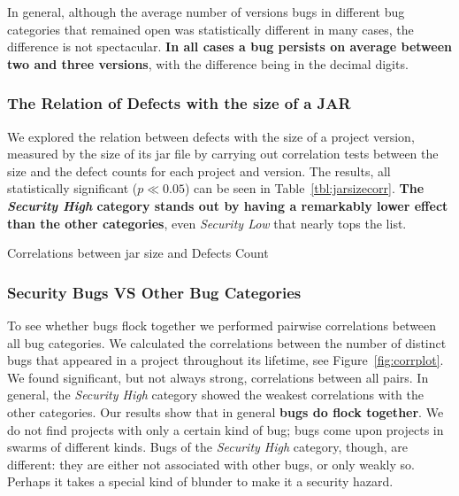 \documentclass{sig-alternate}
\begin{document}
In general, although the average number of versions bugs in different
bug categories that remained open was statistically different in many
cases, the difference is not spectacular. \textbf{In all cases a bug persists
on average between two and three versions}, with the difference being
in the decimal digits.

\subsubsection{The Relation of Defects with the size of a JAR}

We explored the relation between defects with the size of a project
version, measured by the size of its {\sc jar} file by carrying out
correlation tests between the size and the defect counts for each
project and version. The results, all statistically significant ($p
\ll 0.05$) can be seen in Table~\ref{tbl:jarsizecorr}.  \textbf{The {\it
  Security High} category stands out by having a remarkably lower
effect than the other categories}, even {\it Security Low} that nearly
tops the list.

\begin{table}[hbt]
    \centering
    \caption{Correlations between {\sc jar} size and Defects Count}
    \label{tbl:jarsizecorr}
    
\end{table}

\subsubsection{Security Bugs VS Other Bug Categories}

To see whether bugs flock together we performed pairwise correlations
between all bug categories. We calculated the correlations between the
number of distinct bugs that appeared in a project throughout its
lifetime, see Figure~\ref{fig:corrplot}. We found significant, but not always
strong, correlations between all pairs. In general, the {\it Security
  High} category showed the weakest correlations with the other
categories. Our results show that in general \textbf{bugs do flock together}.
We do not find projects with only a certain kind of bug; bugs come
upon projects in swarms of different kinds. Bugs of the {\it Security
  High} category, though, are different: they are either not
associated with other bugs, or only weakly so. Perhaps it takes a
special kind of blunder to make it a security hazard.
\end{document}
